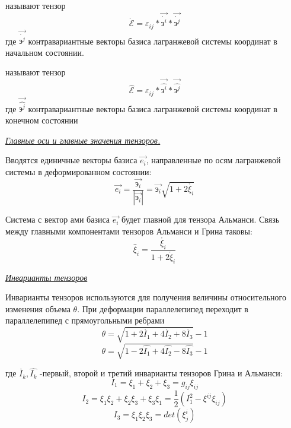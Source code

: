  называют тензор $$\mathring{\mathcal{E}}=\varepsilon_{ij}*\overrightarrow{\mathring{\text{э}^i}}*\overrightarrow{\mathring{\text{э}^j}}$$ где $\overrightarrow{\mathring{\text{э}^j}}$ контравариантные векторы базиса лагранжевой системы координат в начальном состоянии. 

 называют тензор $$\hat{\mathcal{E}}=\varepsilon_{ij}*\overrightarrow{\hat{\text{э}^i}}*\overrightarrow{\hat{\text{э}^j}}$$ где $\overrightarrow{\hat{\text{э}^j}}$ контравариантные векторы базиса лагранжевой системы координат в конечном состоянии


\begin{center}
	\textit{\underline{Главные оси и главные значения тензоров.}}
\end{center}

Вводятся единичные векторы базиса $\overrightarrow{e_i}$, направленные по осям лагранжевой системы в деформированном состоянии:
$$\overrightarrow{e_i}=\frac{\overrightarrow{\text{э}_{i}}}{|\overrightarrow{\text{э}_{i}}|}=\overrightarrow{\text{э}_{i}}\sqrt{1+2\mathring{\xi_i}}$$

Система с вектор ами базиса $\overrightarrow{e_i}$ будет главной для тензора Альманси. 
Связь между главными компонентами тензоров Альманси и Грина таковы:
$$\hat\xi_i=\frac{\mathring{\xi_i}}{1+2\mathring\xi_i}$$

\begin{center}
	\textit{\underline{Инварианты тензоров}}
\end{center}
Инварианты тензоров используются для получения величины относительного изменения объема $\theta$.
При деформации параллелепипед переходит в параллелепипед с прямоугольными ребрами 
$$\theta=\sqrt{1+2\mathring{I_1}+4\mathring{I_2}+8\mathring{I_3}}-1$$
$$\theta=\sqrt{1-2\hat{I_1}+4\hat{I_2}-8\hat{I_3}}-1$$

где $\mathring{I_k},\hat{I_k}$ -первый, второй и третий инварианты тензоров Грина и Альманси:
$$I_1=\xi_1+\xi_2+\xi_3=g_{ij}\xi_{ij}$$
$$I_2=\xi_1\xi_2+\xi_2\xi_3+\xi_3\xi_1=\frac{1}{2}(I_1^2-\xi^{ij}\xi_{ij})$$
$$I_3=\xi_1\xi_2\xi_3=det(\xi_j^i)$$
